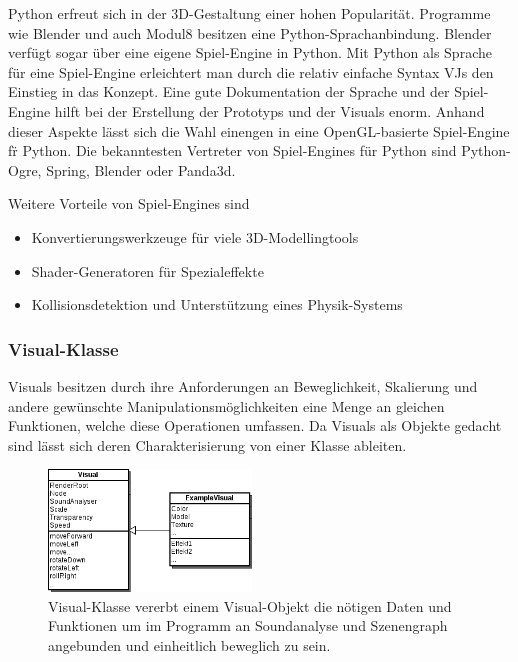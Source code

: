Python erfreut sich in der 3D-Gestaltung einer hohen Popularit\"at. Programme wie Blender und auch Modul8 besitzen eine 
Python-Sprachanbindung. Blender verf\"ugt sogar \"uber eine eigene Spiel-Engine in Python. Mit Python als Sprache f\"ur 
eine Spiel-Engine erleichtert man durch die relativ einfache Syntax VJs den Einstieg in das Konzept. Eine gute Dokumentation
der Sprache und der Spiel-Engine hilft bei der Erstellung der Prototyps und der Visuals enorm. Anhand dieser Aspekte
l\"asst sich die Wahl einengen in eine OpenGL-basierte Spiel-Engine f\"r Python. Die bekanntesten Vertreter von 
Spiel-Engines f\"ur Python sind Python-Ogre, Spring, Blender oder Panda3d.

Weitere Vorteile von Spiel-Engines sind 
\begin{itemize}
    \item Konvertierungswerkzeuge f\"ur viele 3D-Modellingtools
    \item Shader-Generatoren f\"ur Spezialeffekte
    \item Kollisionsdetektion und Unterst\"utzung eines Physik-Systems
\end{itemize}



\subsubsection{Visual-Klasse}

Visuals besitzen durch ihre Anforderungen an Beweglichkeit, Skalierung und andere gew\"unschte Manipulationsm\"oglichkeiten
eine Menge an gleichen Funktionen, welche diese Operationen umfassen. Da Visuals als Objekte gedacht sind l\"asst sich deren
Charakterisierung von einer Klasse ableiten.

\begin{figure}
    \begin{center}
        \includegraphics[width=0.48\textwidth]{pictures/visualclass1.png}
    \end{center}
    \caption{Visual-Klasse vererbt einem Visual-Objekt die n\"otigen Daten und Funktionen um im Programm an Soundanalyse
        und Szenengraph angebunden und einheitlich beweglich zu sein.}
\end{figure}

